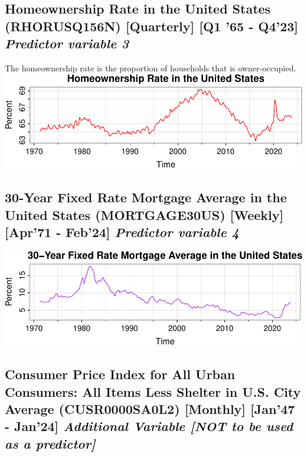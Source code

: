 \documentclass[
  man]{apa6}
\begin{document}
\subsection{\texorpdfstring{Homeownership Rate in the United States (RHORUSQ156N) {[}Quarterly{]} {[}Q1 '65 - Q4'23{]} \emph{Predictor variable 3}}{Homeownership Rate in the United States (RHORUSQ156N) {[}Quarterly{]} {[}Q1 '65 - Q4'23{]} Predictor variable 3}}\label{homeownership-rate-in-the-united-states-rhorusq156n-quarterly-q1-65---q423-predictor-variable-3}

The homeownership rate is the proportion of households that is owner-occupied.
\includegraphics{STAT429Report_files/figure-latex/unnamed-chunk-5-1.pdf}

\subsection{\texorpdfstring{30-Year Fixed Rate Mortgage Average in the United States (MORTGAGE30US) {[}Weekly{]} {[}Apr'71 - Feb'24{]} \emph{Predictor variable 4}}{30-Year Fixed Rate Mortgage Average in the United States (MORTGAGE30US) {[}Weekly{]} {[}Apr'71 - Feb'24{]} Predictor variable 4}}\label{year-fixed-rate-mortgage-average-in-the-united-states-mortgage30us-weekly-apr71---feb24-predictor-variable-4}

\includegraphics{STAT429Report_files/figure-latex/unnamed-chunk-6-1.pdf}

\subsection{\texorpdfstring{Consumer Price Index for All Urban Consumers: All Items Less Shelter in U.S. City Average (CUSR0000SA0L2) {[}Monthly{]} {[}Jan'47 - Jan'24{]} \emph{Additional Variable {[}NOT to be used as a predictor{]}}}{Consumer Price Index for All Urban Consumers: All Items Less Shelter in U.S. City Average (CUSR0000SA0L2) {[}Monthly{]} {[}Jan'47 - Jan'24{]} Additional Variable {[}NOT to be used as a predictor{]}}}\label{consumer-price-index-for-all-urban-consumers-all-items-less-shelter-in-u.s.-city-average-cusr0000sa0l2-monthly-jan47---jan24-additional-variable-not-to-be-used-as-a-predictor}
\end{document}
